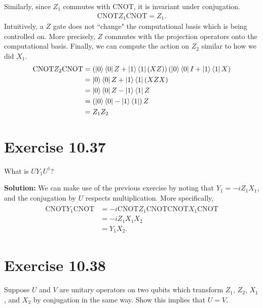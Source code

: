 \documentclass{book}
\begin{document}
    Similarly, since $Z_1$ commutes with $\text{CNOT}$, it is invariant under conjugation.
    \begin{align}
        \text{CNOT} Z_1 \text{CNOT} = Z_1.
    \end{align}
    Intuitively, a $Z$ gate does not ``change" the computational basis which is being controlled on. More precisely, $Z$ commutes with the projection operators onto the computational basis. Finally, we can compute the action on $Z_2$ similar to how we did $X_1$.
    \begin{align}
    \begin{aligned}
        \text{CNOT} Z_2 \text{CNOT} &= \left(\ket{0}\bra{0}Z + \ket{1}\bra{1}(XZ)\right)\left(\ket{0}\bra{0}I + \ket{1}\bra{1}X\right) \\
        &= \ket{0}\bra{0}Z + \ket{1}\bra{1}(XZX) \\
        &= \ket{0}\bra{0}Z -\ket{1}\bra{1}Z \\
        &= \left(\ket{0}\bra{0}-\ket{1}\bra{1}\right) Z \\
        &= Z_1 Z_2
    \end{aligned}
    \end{align}
    
\section*{Exercise 10.37}
    What is $U Y_1 U^{\dagger}$?
    
    \textbf{Solution:} We can make use of the previous exercise by noting that $Y_1 = -i Z_1 X_1$, and the conjugation by $U$ respects multiplication. More specifically,
    \begin{align}
    \begin{aligned}
        \text{CNOT}Y_1 \text{CNOT} &= -i \text{CNOT}Z_1\text{CNOT} \text{CNOT} X_1 \text{CNOT} \\
        &=-i Z_1 X_1 X_2 \\
        &=Y_1 X_2.
    \end{aligned}
    \end{align}
    
\section*{Exercise 10.38}
    Suppose $U$ and $V$ are unitary operators on two qubits which transform $Z_1$, $Z_2$, $X_1$, and $X_2$ by conjugation in the same way. Show this implies that $U = V$.
    
\end{document}
